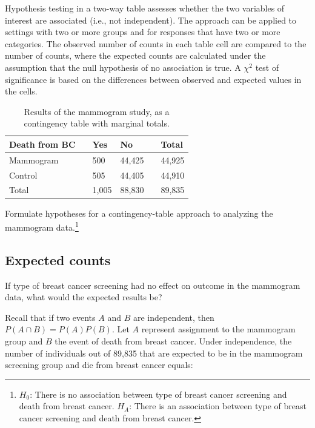 Hypothesis testing in a two-way table assesses whether the two variables of interest are associated (i.e., not independent). The approach can be applied to settings with two or more groups and for responses that have two or more categories. The observed number of counts in each table cell are compared to the number of  counts, where the expected counts are calculated under the assumption that the null hypothesis of no association is true. A $\chi^2$ test of significance is based on the differences between observed and expected values in the cells.

\begin{table}[h]
	\centering
	\begin{tabular}{l| l l l l |l}
		\hline
		Death from BC & \hspace{1mm}  & Yes & No & \hspace{1mm} & Total \\
		\hline
		Mammogram				   &    & 500 & 44,425 & 				&44,925 \\
		Control				   &     & 505	& 44,405    &				& 44,910 \\
		\hline
		Total						   &    & 1,005 & 88,830 & 				& 89,835 \\
		\hline
	\end{tabular}
	\caption{Results of the mammogram study, as a contingency table with marginal totals.}
	\label{mammogramStudySummaryTableWithTotals}
\end{table}

\begin{exercise}Formulate hypotheses for a contingency-table approach to analyzing the mammogram data.\footnote{$H_0$: There is no association between type of breast cancer screening and death from breast cancer. $H_A$: There is an association between type of breast cancer screening and death from breast cancer.}

\end{exercise}

\subsection{Expected counts}
\label{twoWayTablesExpectedCounts}

If type of breast cancer screening had no effect on outcome in the mammogram data, what would the expected results be? 

Recall that if two events $A$ and $B$ are independent, then $P(A \cap B) = P(A)P(B)$. Let $A$ represent assignment to the mammogram group and $B$ the event of death from breast cancer. Under independence, the number of individuals out of 89,835 that are expected to be in the mammogram screening group and die from breast cancer equals:

